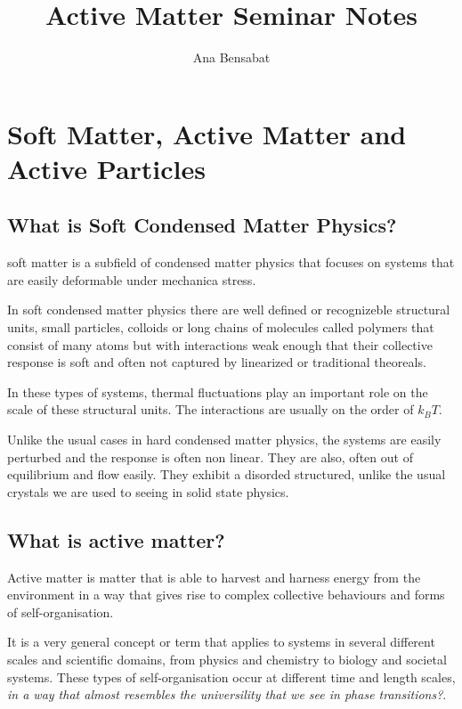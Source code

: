 \documentclass[a4paper]{article}
\title{Active Matter Seminar Notes}
\author{Ana Bensabat}
\begin{document}
\maketitle

\section{Soft Matter, Active Matter and Active Particles}

\subsection{What is Soft Condensed Matter Physics?}

soft matter is a subfield of condensed matter physics that focuses on systems that are easily deformable under mechanica stress.

In soft condensed matter physics there are well defined or recognizeble structural units, small particles, colloids or long chains of molecules called polymers that consist of many atoms but with interactions weak enough that their collective response is soft and often not captured by linearized or traditional theoreals.

In these types of systems, thermal fluctuations play an important role on the scale of these structural units. The interactions are usually on the order of $k_B T$. 

Unlike the usual cases in hard condensed matter physics, the systems are easily perturbed and the response is often non linear. They are also, often out of equilibrium and flow easily. They exhibit a disorded structured, unlike the usual crystals we are used to seeing in solid state physics.

\subsection{What is active matter?}

Active matter is matter that is able to harvest and harness energy from the environment in a way that gives rise to complex collective behaviours and forms of self-organisation.

It is a very general concept or term that applies to systems in several different scales and scientific domains, from physics and chemistry to biology and societal systems. These types of self-organisation occur at different time and length scales, \textit{in a way that almost resembles the universility that we see in phase transitions?}.
\end{document}
